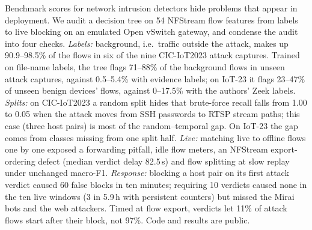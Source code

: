 Benchmark scores for network intrusion detectors hide problems that appear in deployment. We audit a decision tree on 54 NFStream flow features from labels to live blocking on an emulated Open vSwitch gateway, and condense the audit into four checks. \emph{Labels:} background, i.e.\ traffic outside the attack, makes up 90.9--98.5\% of the flows in six of the nine CIC-IoT2023 attack captures. Trained on file-name labels, the tree flags 71--88\% of the background flows in unseen attack captures, against 0.5--5.4\% with evidence labels; on IoT-23 it flags 23--47\% of unseen benign devices' flows, against 0--17.5\% with the authors' Zeek labels. \emph{Splits:} on CIC-IoT2023 a random split hides that brute-force recall falls from 1.00 to 0.05 when the attack moves from SSH passwords to RTSP stream paths; this case (three host pairs) is most of the random--temporal gap. On IoT-23 the gap comes from classes missing from one split half. \emph{Live:} matching live to offline flows one by one exposed a forwarding pitfall, idle flow meters, an NFStream export-ordering defect (median verdict delay 82.5\,s) and flow splitting at slow replay under unchanged macro-F1. \emph{Response:} blocking a host pair on its first attack verdict caused 60 false blocks in ten minutes; requiring 10 verdicts caused none in the ten live windows (3 in 5.9\,h with persistent counters) but missed the Mirai bots and the web attackers. Timed at flow export, verdicts let 11\% of attack flows start after their block, not 97\%. Code and results are public.
